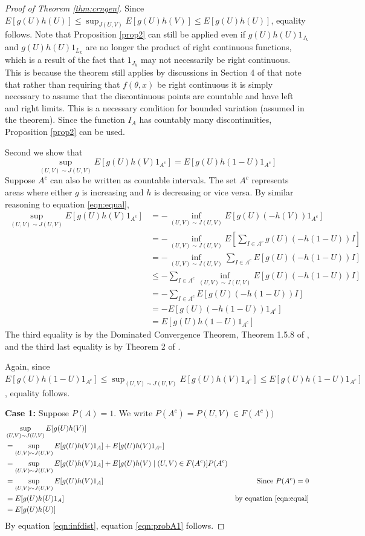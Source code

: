 \documentclass{article}
\theoremstyle{plain}%
\theoremstyle{definition}
\theoremstyle{remark}
\begin{document}
\begin{proof}[Proof of Theorem \ref{thm:crngen}]
		Since $E[g(U)h(U)] \leq \sup_{J(U,V)} E[g(U)h(V)] \leq E[g(U)h(U)]$, equality follows. Note that Proposition \ref{prop2} can still be applied even if $g(U)h(U)1_{J_k}$ and $g(U)h(U)1_{L_k}$ are no longer the product of right continuous functions, which is a result of the fact that $1_{J_k}$ may not necessarily be right continuous. This is because the theorem still applies by discussions in Section 4 of \cite{cambanis1976} that note that rather than requiring that $f(\theta,x)$ be right continuous it is simply necessary to assume that the discontinuous points are countable and have left and right limits. This is a necessary condition for bounded variation (assumed in the theorem). Since the function $I_A$ has countably many discontinuities, Proposition \ref{prop2} can be used.
		
		Second we show that \begin{equation}\label{eqn:equal2}
			\sup_{(U, V) \sim J(U,V)} E[g(U)h(V)1_{A^c}]= E[g(U)h(1-U)1_{A^c}]
		\end{equation}
		Suppose $A^c$ can also be written as countable intervals. The set $A^c$ represents areas where either $g$ is increasing and $h$ is decreasing or vice versa. By similar reasoning to equation \ref{eqn:equal},
		\begin{align*}
			\sup_{(U, V) \sim J(U,V)} E[g(U)h(V)1_{A^c}]&=-\inf_{(U, V) \sim J(U,V)}  E[g(U)(-h(V))1_{A^c}]\\
			&= -\inf_{(U, V) \sim J(U,V)} E[\sum_{I\in A^c}g(U)(-h(1-U))I]\\
			&= -\inf_{(U, V) \sim J(U,V)} \sum_{I\in A^c} E[g(U)(-h(1-U))I] \\
			&\leq -\sum_{I\in A^c} \inf_{(U, V) \sim J(U,V)} E[g(U)(-h(1-U))I]\\
			&=-\sum_{I\in A^c} E[g(U)(-h(1-U))I] \\
			&=- E[g(U)(-h(1-U))1_{A^c}]\\
			&=E[g(U)h(1-U)1_{A^c}]
		\end{align*} 
		The third equality is by the Dominated Convergence Theorem, Theorem 1.5.8 of \cite{durrett}, and the third last equality is by Theorem 2 of \cite{cambanis1976}.
		
		Again, since $E[g(U)h(1-U)1_{A^c}] \leq \sup_{(U, V) \sim J(U,V)} E[g(U)h(V)1_{A^c}]\leq E[g(U)h(1-U)1_{A^c}]$, equality follows. 
		
		\textbf{Case 1:}
		Suppose $P(A)=1$. We write $P(A^c)=P(U,V)\in F(A^c))$
		\begin{align*}
			&\sup_{(U, V) \sim J(U,V)} E[g(U)h(V)]\\
			&= \sup_{(U, V) \sim J(U,V)} E[g(U)h(V)1_{A}] +  E[g(U)h(V)1_{A^c}] \\
			&= \sup_{(U, V) \sim J(U,V)} E[g(U)h(V)1_{A}] +  E[g(U)h(V) \mid (U,V)\in F(A^c)]P(A^c) \\
			&= \sup_{(U, V) \sim J(U,V)} E[g(U)h(V)1_{A}] & \text{Since $P(A^c)=0$} \\
			&= E[g(U)h(U)1_{A}] &\text{by equation \ref{eqn:equal}} \\
			&= E[g(U)h(U)]
		\end{align*}
		By equation \ref{eqn:infdist}, equation \ref{eqn:probA1} follows.
		

\end{proof}
\end{document}
